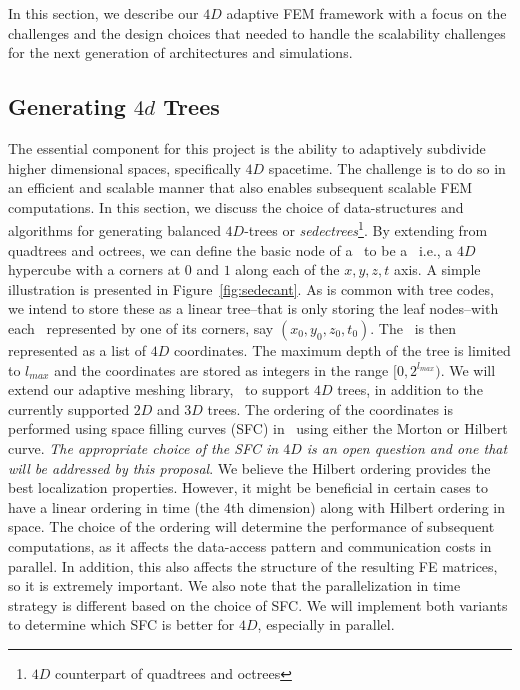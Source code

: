 In this section, we describe our $4D$ adaptive FEM framework with a focus on the challenges and the design choices that needed to handle the scalability challenges for the next generation of architectures and simulations. 

\subsection{Generating $4d$ Trees}


The essential component for this project is the ability to adaptively subdivide higher dimensional spaces, specifically $4D$ spacetime. The challenge is to do so in an efficient and scalable manner that also enables subsequent scalable FEM computations. In this section, we discuss the choice of data-structures and algorithms for generating balanced $4D$-trees or {\em sedectrees}\footnote{$4D$ counterpart of quadtrees and octrees}. By extending from quadtrees and octrees, we can define the basic node of a \stri\ to be a \stra\ i.e., a $4D$ hypercube with a corners at $0$ and $1$ along each of the $x,y,z,t$ axis. A simple illustration is presented in Figure~\ref{fig:sedecant}. As is common with tree codes, we intend to store these as a linear tree--that is only storing the leaf nodes--with each \stra\ represented by one of its corners, say $(x_0, y_0, z_0, t_0)$. The \stri\ is then represented as a list of $4D$ coordinates. The maximum depth of the tree is limited to $l_{max}$ and the coordinates are stored as integers in the range $[0,2^{l_{max}})$.    We will  extend our adaptive meshing library, \dendro\ to support $4D$ trees, in addition to the currently supported $2D$ and $3D$ trees. The ordering of the coordinates is performed using space filling curves (SFC) in \dendro\ using either the Morton or Hilbert curve. {\it The appropriate choice of the SFC in $4D$ is an open question and one that will be addressed by this proposal}. We believe the Hilbert ordering provides the best localization properties. However, it might be beneficial in certain cases to have a linear ordering in time (the $4$th dimension) along with Hilbert ordering in space. The choice of the ordering will determine the performance of subsequent computations, as it affects the data-access pattern and communication costs in parallel. In addition, this also affects the structure of the resulting FE matrices, so it is extremely important. We also note that the parallelization in time strategy is different based on the choice of SFC. We will implement both variants to determine which SFC is better for $4D$, especially in parallel. 

